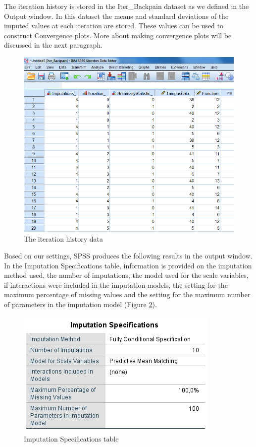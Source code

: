 \documentclass[]{book}
\theoremstyle{definition}
\theoremstyle{definition}
\theoremstyle{definition}
\theoremstyle{remark}
\begin{document}
The iteration history is stored in the Iter\_Backpain dataset as we
defined in the Output window. In this dataset the means and standard
deviations of the imputed values at each iteration are stored. These
values can be used to construct Convergence plots. More about making
convergence plots will be discussed in the next paragraph.

\begin{figure}

{\centering \includegraphics[width=0.9\linewidth]{images/fig4.12} 

}

\caption{The iteration history data}\label{fig:fig4-12}
\end{figure}

Based on our settings, SPSS produces the following results in the output
window. In the Imputation Specifications table, information is provided
on the imputation method used, the number of imputations, the model used
for the scale variables, if interactions were included in the imputation
models, the setting for the maximum percentage of missing values and the
setting for the maximum number of parameters in the imputation model
(Figure \ref{fig:tab4-4}).

\begin{figure}

{\centering \includegraphics[width=0.9\linewidth]{images/tab4.4} 

}

\caption{Imputation Specifications table}\label{fig:tab4-4}
\end{figure}
\end{document}

